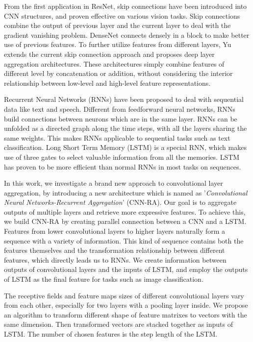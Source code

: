 \documentclass[runningheads]{llncs}
\begin{document}
From the first application in ResNet\cite{resnet}, skip connections have been introduced into CNN structures, and proven effective on various vision tasks. Skip connections combine the output of previous layer and the current layer to deal with the gradient vanishing problem. DenseNet\cite{densenet} connects densely in a block to make better use of previous features. To further utilize features from different layers, Yu\cite{dla} extends the current skip connection approach and proposes deep layer aggregation architectures. These architectures simply combine features of different level by concatenation or addition, without considering the interior relationship between low-level and high-level feature representations. 

Recurrent Neural Networks (RNNs)\cite{rnn} have been proposed to deal with sequential data like text and speech. Different from feedforward neural networks, RNNs build connections between neurons which are in the same layer. RNNs can be unfolded as a directed graph along the time steps, with all the layers sharing the same weights. This makes RNNs applicable to sequential tasks such as text classification. Long Short Term Memory (LSTM)\cite{lstm} is a special RNN, which makes use of three gates to select valuable information from all the memories. LSTM has proven to be more efficient than normal RNNs in most tasks on sequences.

In this work, we investigate a brand new approach to convolutional layer aggregation, by introducing a new architecture which is named as '\emph{Convolutional Neural Networks-Recurrent Aggregation}' (CNN-RA).  Our goal is to aggregate outputs of multiple layers and retrieve more expressive features. To achieve this, we build CNN-RA by creating parallel connection between a CNN and a LSTM. Features from lower convolutional layers to higher layers naturally form a sequence with a variety of information. This kind of sequence contains both the features themselves and the transformation relationship between different features, which directly leads us to RNNs. We create information between outputs of convolutional layers and the inputs of LSTM, and employ the outputs of LSTM as the final feature for tasks such as image classification.

The receptive fields and feature maps sizes of different convolutional layers vary from each other, especially for two layers with a pooling layer inside. We propose an algorithm to transform different shape of feature matrixes to vectors with the same dimension. Then transformed vectors are stacked together as inputs of LSTM. The number of chosen features is the step length of the LSTM.
\end{document}
